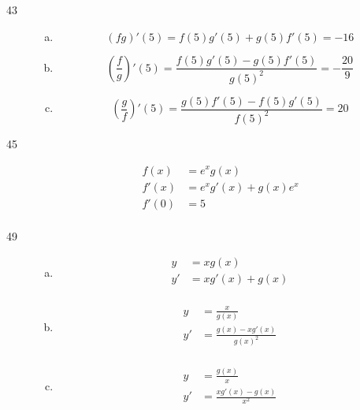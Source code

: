\documentclass[letterpaper]{exam}
\begin{document}
\begin{description}
    \item[43]
      \begin{enumerate}[(a)]

        \item 
          \[
            (fg)'(5) = f(5)g'(5) + g(5)f'(5) = \boxed{ -16 }
          \]

        \item 
          \[
            (\frac{f}{g})'(5) = \frac{f(5)g'(5) - g(5)f'(5)}{g(5)^2} 
              = \boxed{ - \frac{20}{9} }
          \]

        \item 
          \[
            (\frac{g}{f})'(5) = \frac{g(5)f'(5) - f(5)g'(5)}{f(5)^2} = \boxed{ 20 }
          \]

      \end{enumerate}

    \item[45]
      \begin{align*}
        f(x)  & = e^x g(x) \\
        f'(x) & = e^x g'(x) + g(x) e^x \\
        f'(0) & = \boxed{ 5 } \\
      \end{align*}

    \item[49]
      \begin{enumerate}[(a)]

        \item 
          \begin{align*}
            y  & = x g(x) \\
            y' & = x g'(x) + g(x) \\
          \end{align*}

        \item 
          \begin{align*}
            y  & = \frac{x}{g(x)} \\
            y' & = \frac{g(x) - x g'(x)}{g(x)^2} \\
          \end{align*}

        \item 
          \begin{align*}
            y  & = \frac{g(x)}{x} \\
            y' & = \frac{x g'(x) - g(x)}{x^2} \\
          \end{align*}


\end{enumerate}
\end{description}
\end{document}

